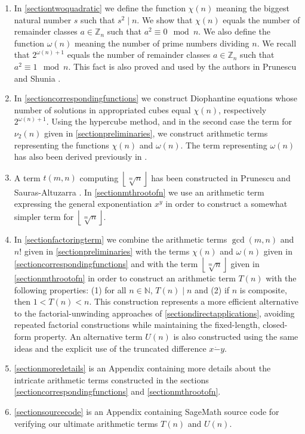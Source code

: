 \documentclass[10pt]{article}
\theoremstyle{plain}
\begin{document}
\begin{enumerate}
    \item In \cref{sectiontwoquadratic} we define the function $\chi(n)$ meaning the biggest natural number $s$ such that $s^2 \mid n$. We show that $\chi(n)$ equals the number of remainder classes $a \in \mathbb Z_n$ such that $a^2 \equiv 0 \mod n$. We also define the function $\omega(n)$ meaning the number of prime numbers dividing $n$. We recall that $2^{\omega(n) + 1}$ equals the number of remainder classes $a \in \mathbb Z_n$ such that $a^2 \equiv 1 \mod n$. This fact is also proved and used by the authors in Prunescu and Shunia \cite{prunescushunia2024primes}.
    \item In \cref{sectioncorrespondingfunctions} we construct Diophantine equations whose number of solutions in appropriated cubes equal $\chi(n)$, respectively $2^{\omega(n) + 1}$. Using the hypercube method, and in the second case the term for $\nu_2(n)$ given in \cref{sectionpreliminaries}, we construct arithmetic terms representing the functions $\chi(n)$ and $\omega(n)$. The term representing $\omega(n)$ has also been derived previously in \cite{prunescushunia2024primes}.
    \item A term $t(m,n)$ computing $\left \lfloor \sqrt[m]{n} \right \rfloor$ has been constructed in Prunescu and Sauras-Altuzarra \cite{prunescu2024numbertheoreticfunctions}. In \cref{sectionmthrootofn} we use an arithmetic term expressing the general exponentiation $x^y$ in order to construct a somewhat simpler term for $\left \lfloor \sqrt[m]{n} \right \rfloor$.
    \item In \cref{sectionfactoringterm} we combine the arithmetic terms $\gcd(m,n)$ and $n!$ given in \cref{sectionpreliminaries} with the terms $\chi(n)$ and $\omega(n)$ given in \cref{sectioncorrespondingfunctions} and with the term $\left \lfloor \sqrt[m]{n} \right \rfloor$ given in \cref{sectionmthrootofn} in order to construct an arithmetic term $T(n)$ with the following properties: (1) for all $n \in \mathbb N$, $T(n) \mid n$ and (2) if $n$ is composite, then $1 < T(n) < n$. This construction represents a more efficient alternative to the factorial-unwinding approaches of \cref{sectiondirectapplications}, avoiding repeated factorial constructions while maintaining the fixed-length, closed-form property. An alternative term $U(n)$ is also constructed using the same ideas and the explicit use of the truncated difference $x \dot{-} y$.
    \item \cref{sectionmoredetails} is an Appendix containing more details about the intricate arithmetic terms constructed in the sections \cref{sectioncorrespondingfunctions} and \cref{sectionmthrootofn}.
    \item \cref{sectionsourcecode} is an Appendix containing SageMath source code for verifying our ultimate arithmetic terms $T(n)$ and $U(n)$.
\end{enumerate}
\end{document}
